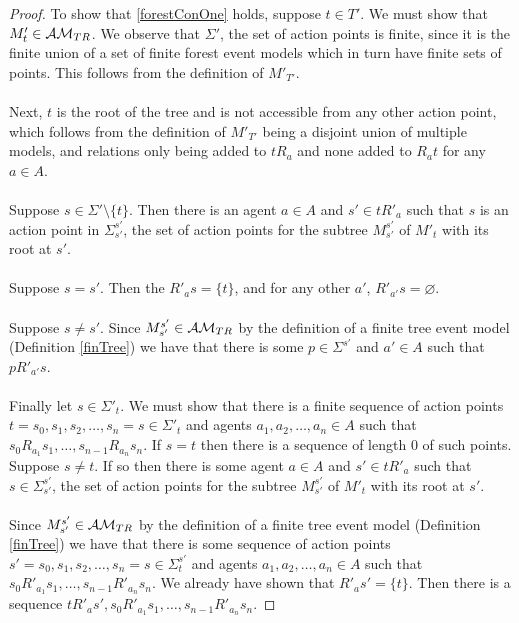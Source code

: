 \begin{proof}
To show that \ref{forestConOne} holds, suppose $t \in T'$.
We must show that $M'_t \in \mathcal{AM}_{TR}$.
We observe that $\Sigma'$, the set of action points is finite, since it is the finite union of a set
of finite forest event models which in turn have finite sets of points. This follows from the
definition of $M'_{T'}$.\\
\\
Next, $t$ is the root of the tree and is not accessible from any other action point, which follows
from the definition of $M'_{T'}$ being a disjoint union of multiple models, and relations only
being added to $t R_a$ and none added to $R_a t$ for any $a \in A$.\\
\\
Suppose $s \in \Sigma' \setminus \{ t \}$.
Then there is an agent $a \in A$ and $s' \in t R'_a$ such that $s$ is an action point in
$\Sigma^{s'}_{s'}$, the set of action points for the subtree $M^{s'}_{s'}$ of $M'_t$ with its root at
$s'$.\\
\\
Suppose $s = s'$.
Then the $R'_a s = \{ t \}$, and for any other $a'$, $R'_{a'} s = \varnothing$.\\
\\
Suppose $s \neq s'$.
Since $M^{s'}_{s'} \in \mathcal{AM}_{TR}$ by the definition of a finite tree event model (Definition \ref{finTree}) we have that there is some
$p \in \Sigma^{s'}$ and $a' \in A$ such that $p R'_{a'} s$.\\
\\
Finally let $s \in \Sigma'_t$.
We must show that there is a finite sequence of action points $t = s_0, s_1, s_2, \ldots, s_n = s
\in \Sigma'_t$ and agents $a_1, a_2, \ldots, a_n \in A$ such that $s_0 R_{a_1} s_1, \ldots, s_{n-1}
R_{a_n} s_n$.
If $s = t$ then there is a sequence of length 0 of such points.
Suppose $s \neq t$.
If so then there is some agent $a \in A$ and $s' \in t R'_a$ such that $s \in \Sigma^{s'}_{s'}$, the set
of action points for the subtree $M^{s'}_{s'}$ of $M'_t$ with its root at $s'$.\\
\\
Since $M^{s'}_{s'} \in \mathcal{AM}_{TR}$ by the definition of a finite tree event model (Definition
\ref{finTree}) we have that there is some sequence of action points $s' = s_0, s_1, s_2, \ldots, s_n =
s \in \Sigma^{s'}_t$ and agents $a_1, a_2, \ldots, a_n \in A$ such that $s_0 R'_{a_1} s_1, \ldots,
s_{n-1} R'_{a_n} s_n$.
We already have shown that $R'_a s' = \{ t \}$.
Then there is a sequence $t R'_a s', s_0 R'_{a_1} s_1, \ldots, s_{n-1} R'_{a_n} s_n$.

\end{proof}
